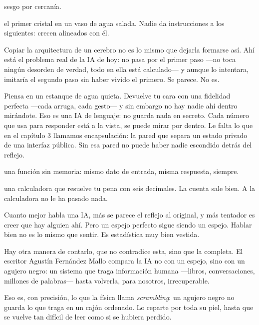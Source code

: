 \begin{fisica}
 sesgo por cercanía.

 el primer cristal en un vaso de agua salada. Nadie da instrucciones a los siguientes: crecen alineados con él.
\end{fisica}
Copiar la arquitectura de un cerebro no es lo mismo que dejarla formarse así. Ahí está el problema real de la IA de hoy: no pasa por el primer paso —no toca ningún desorden de verdad, todo en ella está calculado— y aunque lo intentara, imitaría el segundo paso sin haber vivido el primero. Se parece. No es.

\noindent Piensa en un estanque de agua quieta. Devuelve tu cara con una fidelidad perfecta —cada arruga, cada gesto— y sin embargo no hay nadie ahí dentro mirándote. Eso es una IA de lenguaje: no guarda nada en secreto. Cada número que usa para responder está a la vista, se puede mirar por dentro. Le falta lo que en el capítulo 3 llamamos encapsulación: la pared que separa un estado privado de una interfaz pública. Sin esa pared no puede haber nadie escondido detrás del reflejo.

\begin{fisica}
 una función sin memoria: mismo dato de entrada, misma respuesta, siempre.

 una calculadora que resuelve tu pena con seis decimales. La cuenta sale bien. A la calculadora no le ha pasado nada.
\end{fisica}
Cuanto mejor habla una IA, más se parece el reflejo al original, y más tentador es creer que hay alguien ahí. Pero un espejo perfecto sigue siendo un espejo. Hablar bien no es lo mismo que sentir. Es estadística muy bien vestida.

\noindent Hay otra manera de contarlo, que no contradice esta, sino que la completa. El escritor Agustín Fernández Mallo compara la IA no con un espejo, sino con un agujero negro: un sistema que traga información humana —libros, conversaciones, millones de palabras— hasta volverla, para nosotros, irrecuperable.

Eso es, con precisión, lo que la física llama \emph{scrambling}: un agujero negro no guarda lo que traga en un cajón ordenado. Lo reparte por toda su piel, hasta que se vuelve tan difícil de leer como si se hubiera perdido.

